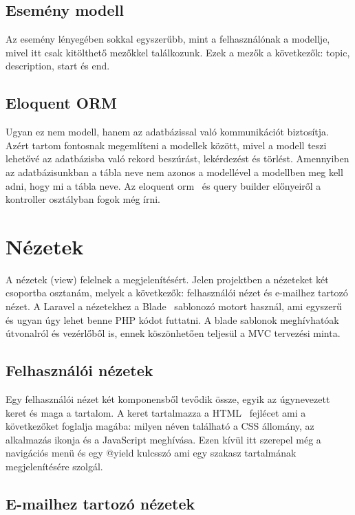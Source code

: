 \documentclass[
]{thesis-ekf}
\theoremstyle{definition}
\theoremstyle{remark}
\begin{document}
\subsection{Esemény modell}
Az esemény lényegében sokkal egyszerűbb, mint a felhasználónak a modellje, mivel itt csak kitölthető mezőkkel találkozunk. Ezek a mezők a következők: topic, description, start és end.

\subsection{Eloquent ORM}
Ugyan ez nem modell, hanem az adatbázissal való kommunikációt biztosítja. Azért tartom fontosnak megemlíteni a modellek között, mivel a modell teszi lehetővé az adatbázisba való rekord beszúrást, lekérdezést és törlést. Amennyiben az adatbázisunkban a tábla neve nem azonos a modellével a modellben meg kell adni, hogy mi a tábla neve. Az eloquent orm~\cite{laravel_eloquent} és query builder előnyeiről a kontroller osztályban fogok még írni.

\section{Nézetek}
A nézetek (view) felelnek a megjelenítésért. Jelen projektben a nézeteket két csoportba osztanám, melyek a következők: felhasználói nézet és e-mailhez tartozó nézet. A Laravel a nézetekhez a Blade~\cite{laravel_blade} sablonozó motort használ, ami egyszerű és ugyan úgy lehet benne PHP kódot futtatni. A blade sablonok meghívhatóak útvonalról és vezérlőből is, ennek köszönhetően teljesül a MVC tervezési minta.

\subsection{Felhasználói nézetek}

Egy felhasználói nézet két komponensből tevődik össze, egyik az úgynevezett keret és maga a tartalom. A keret tartalmazza a HTML~\cite{html_doc} fejlécet ami a következőket foglalja magába: milyen néven található a CSS állomány, az alkalmazás ikonja és a JavaScript meghívása. Ezen kívül itt szerepel még a navigációs menü és egy @yield kulcsszó ami egy szakasz tartalmának megjelenítésére szolgál. 

\subsection{E-mailhez tartozó nézetek}
\end{document}
